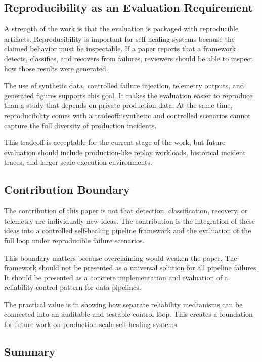 \subsection{Reproducibility as an Evaluation Requirement}

A strength of the work is that the evaluation is packaged with reproducible artifacts. Reproducibility is important for self-healing systems because the claimed behavior must be inspectable. If a paper reports that a framework detects, classifies, and recovers from failures, reviewers should be able to inspect how those results were generated.

The use of synthetic data, controlled failure injection, telemetry outputs, and generated figures supports this goal. It makes the evaluation easier to reproduce than a study that depends on private production data. At the same time, reproducibility comes with a tradeoff: synthetic and controlled scenarios cannot capture the full diversity of production incidents.

This tradeoff is acceptable for the current stage of the work, but future evaluation should include production-like replay workloads, historical incident traces, and larger-scale execution environments.

\subsection{Contribution Boundary}

The contribution of this paper is not that detection, classification, recovery, or telemetry are individually new ideas. The contribution is the integration of these ideas into a controlled self-healing pipeline framework and the evaluation of the full loop under reproducible failure scenarios.

This boundary matters because overclaiming would weaken the paper. The framework should not be presented as a universal solution for all pipeline failures. It should be presented as a concrete implementation and evaluation of a reliability-control pattern for data pipelines.

The practical value is in showing how separate reliability mechanisms can be connected into an auditable and testable control loop. This creates a foundation for future work on production-scale self-healing systems.

\subsection{Summary}

